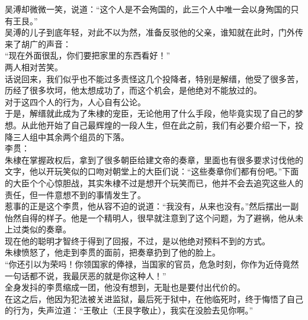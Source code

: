 \begin{multicols}{\theparacolNo}
吴溥却微微一笑，说道：“这个人是不会殉国的，此三个人中唯一会以身殉国的只有王艮。”\\

吴溥的儿子到底年轻，对此不以为然，准备反驳他的父亲，谁知就在此时，门外传来了胡广的声音：\\

“现在外面很乱，你们要把家里的东西看好！”\\

两人相对苦笑。\\

话说回来，我们似乎也不能过多责怪这几个投降者，特别是解缙，他受了很多苦，历经了很多坎坷，他太想成功了，而这个机会，是他绝对不能放过的。\\

对于这四个人的行为，人心自有公论。\\

于是，解缙就此成为了朱棣的宠臣，无论他用了什么手段，他毕竟实现了自己的梦想。从此他开始了自己最辉煌的一段人生，但在此之前，我们有必要介绍一下，投降三人组中其余两个组员的下落。\\

李贯：\\

朱棣在掌握政权后，拿到了很多朝臣给建文帝的奏章，里面也有很多要求讨伐他的文字，他以开玩笑似的口吻对朝堂上的大臣们说：“这些奏章你们都有份吧。”下面的大臣个个心惊胆战，其实朱棣不过是想开个玩笑而已，他并不会去追究这些人的责任，但一件意想不到的事情发生了。\\

惹事的正是这个李贯，他从容不迫的说道：“我没有，从来也没有。”然后摆出一副怡然自得的样子。他是一个精明人，很早就注意到了这个问题，为了避祸，他从未上过类似的奏章。\\

现在他的聪明才智终于得到了回报，不过，是以他绝对预料不到的方式。\\

朱棣愤怒了，他走到李贯的面前，把奏章扔到了他的脸上。\\

“你还引以为荣吗！你领国家的俸禄，当国家的官员，危急时刻，你作为近侍竟然一句话都不说，我最厌恶的就是你这种人！”\\

全身发抖的李贯缩成一团，他没有想到，无耻也是要付出代价的。\\

在这之后，他因为犯法被关进监狱，最后死于狱中，在他临死时，终于悔悟了自己的行为，失声泣道：“王敬止（王艮字敬止），我实在没脸去见你啊。”\\


\end{multicols}
